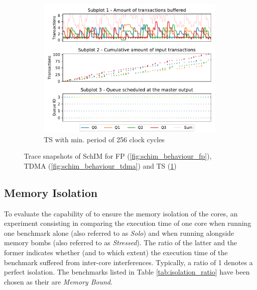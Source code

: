 \begin{figure}[]
\begin{subfigure}{0.5\textwidth}
      \end{subfigure}
      \vfill
      \begin{subfigure}{0.5\textwidth}
        \centering
        \includegraphics[scale=0.55]{images/SchIM_MG_buffering.pdf}
        \caption{TS with min. period of 256 clock cycles}
        \label{fig:schim_behaviour_mg}
      \end{subfigure}
      \caption{Trace snapshots of SchIM for FP (\ref{fig:schim_behaviour_fp}), TDMA (\ref{fig:schim_behaviour_tdma}) and TS (\ref{fig:schim_behaviour_mg})}
      \label{fig:schim_behaviour}
    \end{figure}

  \subsection{Memory Isolation}
    To evaluate the capability of \schim to ensure the memory isolation of the cores, an experiment consisting in comparing the execution time of one core when running one benchmark alone (also referred to as \emph{Solo}) and when running alongside memory bombs (also referred to as \emph{Stressed}). The ratio of the latter and the former indicates whether (and to which extent) the execution time of the benchmark suffered from inter-core interferences. Typically, a ratio of 1 denotes a perfect isolation. The benchmarks listed in Table \ref{tab:isolation_ratio} have been chosen as their are \emph{Memory Bound}.
    
